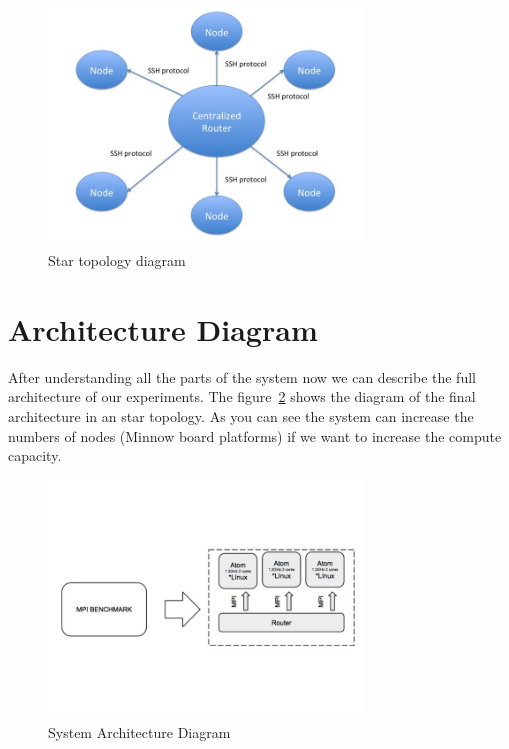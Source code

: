 \begin{figure}[H]
\centering
\includegraphics[width=0.75\textwidth]{images/star_topology.png}
\caption{Star topology diagram}
\label{fig:4.3}
\end{figure}


\section{Architecture Diagram}

After understanding all the parts of the system now we can describe the full
architecture of our experiments. The figure~\ref{fig:4.4} shows the diagram of
the final architecture in an star topology. As you can see the system can
increase the numbers of nodes (Minnow board platforms) if we want to increase
the compute capacity.


\begin{figure}[H]
\centering
\includegraphics[width=0.75\textwidth]{images/full_diagram.jpg}
\caption{System Architecture Diagram }
\label{fig:4.4}
\end{figure}

\noindent

\clearpage
